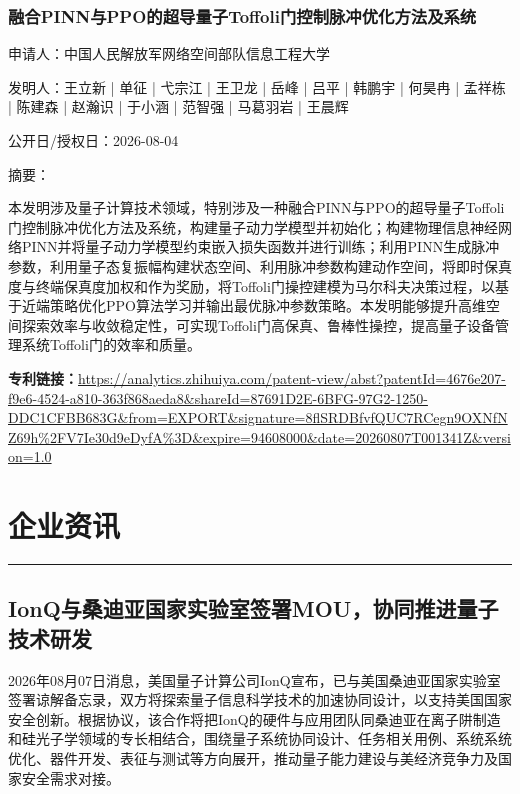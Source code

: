 \documentclass[12pt,a4paper]{ctexart}
\begin{document}
\subsubsection{ 融合PINN与PPO的超导量子Toffoli门控制脉冲优化方法及系统 }

申请人：中国人民解放军网络空间部队信息工程大学

发明人：王立新 | 单征 | 弋宗江 | 王卫龙 | 岳峰 | 吕平 | 韩鹏宇 | 何昊冉 | 孟祥栋 | 陈建森 | 赵瀚识 | 于小涵 | 范智强 | 马葛羽岩 | 王晨辉

公开日/授权日：2026-08-04

摘要：

本发明涉及量子计算技术领域，特别涉及一种融合PINN与PPO的超导量子Toffoli门控制脉冲优化方法及系统，构建量子动力学模型并初始化；构建物理信息神经网络PINN并将量子动力学模型约束嵌入损失函数并进行训练；利用PINN生成脉冲参数，利用量子态复振幅构建状态空间、利用脉冲参数构建动作空间，将即时保真度与终端保真度加权和作为奖励，将Toffoli门操控建模为马尔科夫决策过程，以基于近端策略优化PPO算法学习并输出最优脉冲参数策略。本发明能够提升高维空间探索效率与收敛稳定性，可实现Toffoli门高保真、鲁棒性操控，提高量子设备管理系统Toffoli门的效率和质量。

\noindent\textbf{专利链接：}\url{https://analytics.zhihuiya.com/patent-view/abst?patentId=4676e207-f9e6-4524-a810-363f868aeda8&shareId=87691D2E-6BFG-97G2-1250-DDC1CFBB683G&from=EXPORT&signature=8flSRDBfvfQUC7RCegn9OXNfNZ69h%2FV7Ie30d9eDyfA%3D&expire=94608000&date=20260807T001341Z&version=1.0}




\newpage
\section{企业资讯}
\vspace{-0.5em}
\noindent\rule{\linewidth}{1.5pt}

\subsection{ IonQ与桑迪亚国家实验室签署MOU，协同推进量子技术研发 }

2026年08月07日消息，美国量子计算公司IonQ宣布，已与美国桑迪亚国家实验室签署谅解备忘录，双方将探索量子信息科学技术的加速协同设计，以支持美国国家安全创新。根据协议，该合作将把IonQ的硬件与应用团队同桑迪亚在离子阱制造和硅光子学领域的专长相结合，围绕量子系统协同设计、任务相关用例、系统系统优化、器件开发、表征与测试等方向展开，推动量子能力建设与美经济竞争力及国家安全需求对接。
\end{document}
